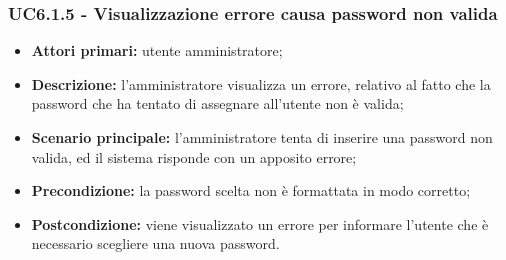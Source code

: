 \subsubsection{UC6.1.5 - Visualizzazione errore causa password non valida}
\begin{itemize}
	\item \textbf{Attori primari:} utente amministratore;
	\item \textbf{Descrizione:} l'amministratore visualizza un errore, relativo al fatto che la password che ha tentato di assegnare all'utente non è valida;
	\item \textbf{Scenario principale:} l'amministratore tenta di inserire una password non valida, ed il sistema risponde con un apposito errore;
	\item \textbf{Precondizione:} la password scelta non è formattata in modo corretto;
	\item \textbf{Postcondizione:} viene visualizzato un errore per informare l'utente che è necessario scegliere una nuova password.
\end{itemize}

